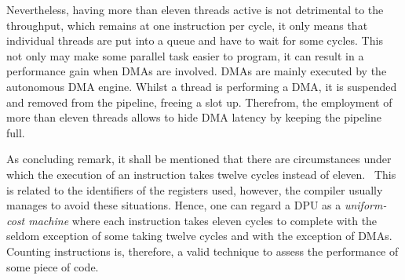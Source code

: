 Nevertheless, having more than eleven threads active is not detrimental to the throughput, which remains at one instruction per cycle, it only means that individual threads are put into a queue and have to wait for some cycles.
This not only may make some parallel task easier to program, it can result in a performance gain when \acp{DMA} are involved.
\Acp{DMA} are mainly executed by the autonomous \ac{DMA} engine.
Whilst a thread is performing a \ac{DMA}, it is suspended and removed from the pipeline, freeing a slot up.
Therefrom, the employment of more than eleven threads allows to hide \ac{DMA} latency by keeping the pipeline full.

As concluding remark, it shall be mentioned that there are circumstances under which the execution of an instruction takes twelve cycles instead of eleven.~\cite[Instruction Set Architecture -- Efficient scheduling]{upmemSDK}
This is related to the identifiers of the registers used, however, the compiler usually manages to avoid these situations.
Hence, one can regard a \ac{DPU} as a \emph{uniform-cost machine} where each instruction takes eleven cycles to complete with the seldom exception of some taking twelve cycles and with the exception of \acp{DMA}.
Counting instructions is, therefore, a valid technique to assess the performance of some piece of code.
